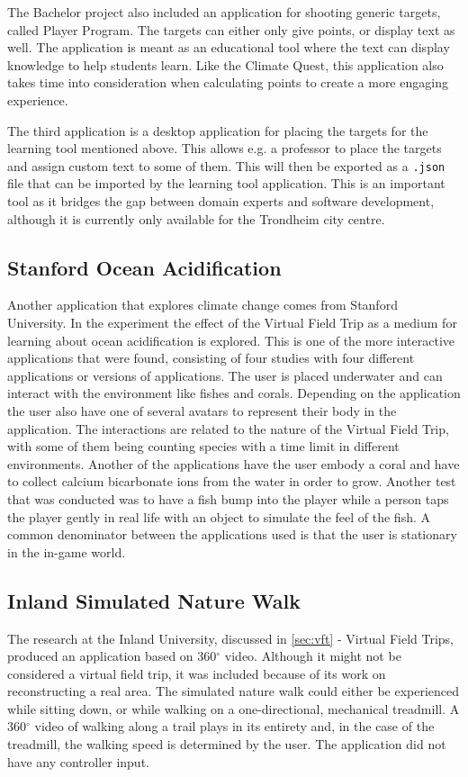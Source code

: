         The Bachelor project also included an application for shooting generic targets, called Player Program. The targets can either only give points, or display text as well. The application is meant as an educational tool where the text can display knowledge to help students learn. Like the Climate Quest, this application also takes time into consideration when calculating points to create a more engaging experience.
        
        The third application is a desktop application for placing the targets for the learning tool mentioned above. This allows e.g. a professor to place the targets and assign custom text to some of them. This will then be exported as a \texttt{.json} file that can be imported by the learning tool application. This is an important tool as it bridges the gap between domain experts and software development, although it is currently only available for the Trondheim city centre.
        
    \subsection{Stanford Ocean Acidification}
        Another application that explores climate change comes from Stanford University\cite{virtual_field_trips_learning}. In the experiment the effect of the Virtual Field Trip as a medium for learning about ocean acidification is explored. This is one of the more interactive applications that were found, consisting of four studies with four different applications or versions of applications. The user is placed underwater and can interact with the environment like fishes and corals. Depending on the application the user also have one of several avatars to represent their body in the application. The interactions are related to the nature of the Virtual Field Trip, with some of them being counting species with a time limit in different environments. Another of the applications have the user embody a coral and have to collect calcium bicarbonate ions from the water in order to grow. Another test that was conducted was to have a fish bump into the player while a person taps the player gently in real life with an object to simulate the feel of the fish. A common denominator between the applications used is that the user is stationary in the in-game world.
        
    \subsection{Inland Simulated Nature Walk}
        The research at the Inland University, discussed in \cref{sec:vft} - Virtual Field Trips, produced an application based on 360$^{\circ}$ video. Although it might not be considered a virtual field trip, it was included because of its work on reconstructing a real area. The simulated nature walk\cite{ive} could either be experienced while sitting down, or while walking on a one-directional, mechanical treadmill. A 360$^{\circ}$ video of walking along a trail plays in its entirety and, in the case of the treadmill, the walking speed is determined by the user. The application did not have any controller input.
        
